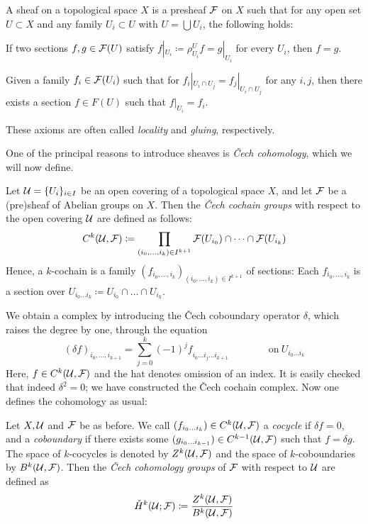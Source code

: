 \documentclass[parskip=half]{scrartcl}
\begin{document}
\begin{mydef}
	A sheaf on a topological space $X$ is a presheaf $\mathcal{F}$ on $X$ such that for any open set $U\subset X$ and any family $U_i\subset U$ with $U=\bigcup U_i$, the following holds:
	\begin{numberedlist}
		\item If two sections $f,g\in \mathcal{F}(U)$ satisfy $f|_{U_i}\coloneqq \rho^U_{U_i}f=g|_{U_i}$ for every $U_i$, then $f=g$.
		\item Given a family $f_i\in \mathcal{F}(U_i)$ such that for $f_i|_{U_i\cap U_j}=f_j|_{U_i\cap U_j}$ for any $i,j$, then there exists a section $f\in F(U)$ such that $f|_{U_i}=f_i$.
	\end{numberedlist}
	These axioms are often called \emph{locality} and \emph{gluing}, respectively.
\end{mydef}

One of the principal reasons to introduce sheaves is \emph{\v{C}ech cohomology}, which we will now define. 

\begin{mydef}
	Let $\mathcal{U}=\{U_i\}_{i\in I}$ be an open covering of a topological space $X$, and let $\mathcal{F}$ be a (pre)sheaf of Abelian groups on $X$. Then the \emph{\v{C}ech cochain groups} with respect to the open covering $\mathcal{U}$ are defined as follows:
	\begin{equation*}
		C^k(\mathcal{U},\mathcal{F})\coloneqq \prod_{(i_0,\dots,i_k)\in I^{k+1}} \mathcal{F}(U_{i_0})\cap\dots \cap \mathcal{F}(U_{i_k})
	\end{equation*}
	Hence, a $k$-cochain is a family $(f_{i_0,\dots,i_k})_{(i_0,\dots,i_k)\in I^{k+1}}$ of sections: Each $f_{i_0,\dots,i_k}$ is a section over $U_{i_0\dots i_k}\coloneqq U_{i_0}\cap\dots\cap U_{i_k}$.
\end{mydef}
We obtain a complex by introducing the \v{C}ech coboundary operator $\delta$, which raises the degree by one, through the equation
\begin{equation*}
	(\delta f)_{i_0,\dots,i_{k+1}}=\sum_{j=0}^k (-1)^j f_{i_0\dots \hat i_j\dots i_{k+1}} 
	\qquad \qquad \text{on}\ U_{i_0\dots i_k}
\end{equation*}
Here, $f\in C^k(\mathcal{U},\mathcal{F})$ and the hat denotes omission of an index. It is easily checked that indeed $\delta^2=0$; we have constructed the \v{C}ech cochain complex. Now one defines the cohomology as usual:

\begin{mydef}
	Let $X,\mathcal{U}$ and $\mathcal{F}$ be as before. We call $(f_{i_0\dots i_k})\in C^k(\mathcal{U},\mathcal{F})$ a \emph{cocycle} if $\delta f=0$, and a \emph{coboundary} if there exists some $(g_{i_0\dots i_{k-1}})\in C^{k-1}(\mathcal{U},\mathcal{F})$ such that $f=\delta g$. The space of $k$-cocycles is denoted by $Z^k(\mathcal{U},\mathcal{F})$ and the space of $k$-coboundaries by $B^k(\mathcal{U},\mathcal{F})$. Then the \emph{\v{C}ech cohomology groups} of $\mathcal{F}$ with respect to $\mathcal{U}$ are defined as
	\begin{equation*}
		\check H^k(\mathcal{U};\mathcal{F})\coloneqq \frac{Z^k(\mathcal{U},\mathcal{F})}{B^k(\mathcal{U},\mathcal{F})}
	\end{equation*}
\end{mydef}
\end{document}
